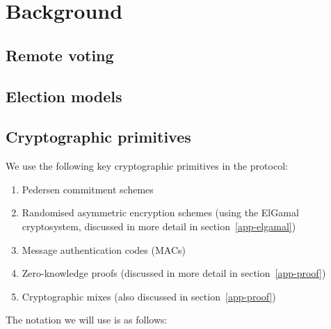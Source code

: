 \documentclass[11pt,twoside,a4paper]{article}
\theoremstyle{definition}
\begin{document}
\section{Background}\label{sec-background}
\subsection{Remote voting}
\subsection{Election models}
\subsection{Cryptographic primitives}
We use the following key cryptographic primitives in the protocol:
\begin{enumerate}
    \item Pedersen commitment schemes
    \item Randomised asymmetric encryption schemes (using the ElGamal cryptosystem, discussed in more detail in section~\ref{app-elgamal})
    \item Message authentication codes (MACs)
    \item Zero-knowledge proofs (discussed in more detail in section~\ref{app-proof})
    \item Cryptographic mixes (also discussed in section~\ref{app-proof})
\end{enumerate}
The notation we will use is as follows:
\end{document}
